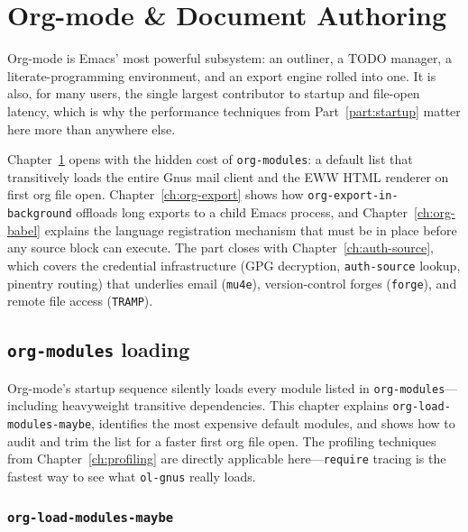 \part{Org-mode \& Document Authoring}
\label{part:org}

Org-mode is Emacs' most powerful subsystem: an outliner, a TODO
manager, a literate-programming environment, and an export engine
rolled into one.  It is also, for many users, the single largest
contributor to startup and file-open latency, which is why the
performance techniques from Part~\ref{part:startup} matter here more
than anywhere else.

Chapter~\ref{ch:org-modules} opens with the hidden cost of
\texttt{org-modules}: a default list that transitively loads the
entire Gnus mail client and the EWW HTML renderer on first org file
open.  Chapter~\ref{ch:org-export} shows how
\texttt{org-export-in-background} offloads long exports to a child
Emacs process, and Chapter~\ref{ch:org-babel} explains the language
registration mechanism that must be in place before any source block
can execute.  The part closes with Chapter~\ref{ch:auth-source},
which covers the credential infrastructure (GPG decryption,
\texttt{auth-source} lookup, pinentry routing) that underlies email
(\texttt{mu4e}), version-control forges (\texttt{forge}), and remote
file access (\texttt{TRAMP}).

\chapter{\texttt{org-modules} loading}
\label{ch:org-modules}
\minitoc\label{org-modules-loading}

Org-mode's startup sequence silently loads every module listed in
\texttt{org-modules}---including heavyweight transitive dependencies.
This chapter explains \texttt{org-load-modules-maybe}, identifies the
most expensive default modules, and shows how to audit and trim the
list for a faster first org file open.  The profiling techniques from
Chapter~\ref{ch:profiling} are directly applicable here---\texttt{require}
tracing is the fastest way to see what \texttt{ol-gnus} really loads.

\section{\texttt{org-load-modules-maybe}}\label{org-load-modules-maybe}

